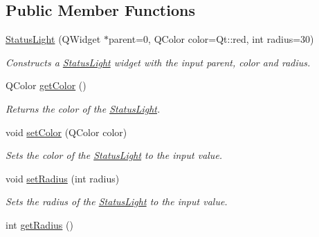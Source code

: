 \subsection*{Public Member Functions}
\begin{DoxyCompactItemize}
\item 
\hypertarget{class_status_light_aff4a7c41196fdce68aead25282b3034f}{\hyperlink{class_status_light_aff4a7c41196fdce68aead25282b3034f}{Status\-Light} (Q\-Widget $\ast$parent=0, Q\-Color color=Qt\-::red, int radius=30)}\label{class_status_light_aff4a7c41196fdce68aead25282b3034f}

\begin{DoxyCompactList}\small\item\em Constructs a \hyperlink{class_status_light}{Status\-Light} widget with the input parent, color and radius. \end{DoxyCompactList}\item 
\hypertarget{class_status_light_ab7e9afad3864345c54df433b86f2dcae}{Q\-Color \hyperlink{class_status_light_ab7e9afad3864345c54df433b86f2dcae}{get\-Color} ()}\label{class_status_light_ab7e9afad3864345c54df433b86f2dcae}

\begin{DoxyCompactList}\small\item\em Returns the color of the \hyperlink{class_status_light}{Status\-Light}. \end{DoxyCompactList}\item 
\hypertarget{class_status_light_adeaa93e9fdd419ac63e55c850eab730f}{void \hyperlink{class_status_light_adeaa93e9fdd419ac63e55c850eab730f}{set\-Color} (Q\-Color color)}\label{class_status_light_adeaa93e9fdd419ac63e55c850eab730f}

\begin{DoxyCompactList}\small\item\em Sets the color of the \hyperlink{class_status_light}{Status\-Light} to the input value. \end{DoxyCompactList}\item 
\hypertarget{class_status_light_a1f3d42cafc56e862980960ffb4f4eb90}{void \hyperlink{class_status_light_a1f3d42cafc56e862980960ffb4f4eb90}{set\-Radius} (int radius)}\label{class_status_light_a1f3d42cafc56e862980960ffb4f4eb90}

\begin{DoxyCompactList}\small\item\em Sets the radius of the \hyperlink{class_status_light}{Status\-Light} to the input value. \end{DoxyCompactList}\item 
\hypertarget{class_status_light_aec8873097154efb946e9ca5c4db68195}{int \hyperlink{class_status_light_aec8873097154efb946e9ca5c4db68195}{get\-Radius} ()}\label{class_status_light_aec8873097154efb946e9ca5c4db68195}


\end{DoxyCompactItemize}
